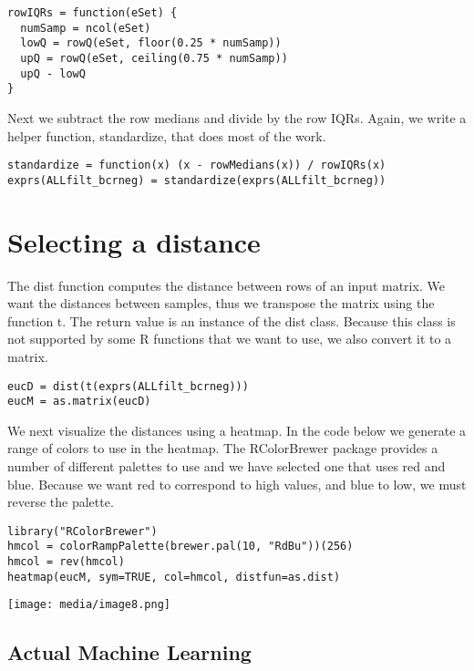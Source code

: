 \begin{verbatim}
rowIQRs = function(eSet) {
  numSamp = ncol(eSet)
  lowQ = rowQ(eSet, floor(0.25 * numSamp))
  upQ = rowQ(eSet, ceiling(0.75 * numSamp))
  upQ - lowQ
}
\end{verbatim}

Next we subtract the row medians and divide by the row IQRs. Again, we
write a helper function, standardize, that does most of the work.

\begin{verbatim}
standardize = function(x) (x - rowMedians(x)) / rowIQRs(x)
exprs(ALLfilt_bcrneg) = standardize(exprs(ALLfilt_bcrneg))
\end{verbatim}

\hypertarget{selecting-a-distance}{%
\section{Selecting a distance}\label{selecting-a-distance}}

The dist function computes the distance between rows of an input matrix.
We want the distances between samples, thus we transpose the matrix
using the function t. The return value is an instance of the dist class.
Because this class is not supported by some R functions that we want to
use, we also convert it to a matrix.

\begin{verbatim}
eucD = dist(t(exprs(ALLfilt_bcrneg)))
eucM = as.matrix(eucD)
\end{verbatim}

We next visualize the distances using a heatmap. In the code below we
generate a range of colors to use in the heatmap. The RColorBrewer
package provides a number of different palettes to use and we have
selected one that uses red and blue. Because we want red to correspond
to high values, and blue to low, we must reverse the palette.

\begin{verbatim}
library("RColorBrewer")
hmcol = colorRampPalette(brewer.pal(10, "RdBu"))(256)
hmcol = rev(hmcol)
heatmap(eucM, sym=TRUE, col=hmcol, distfun=as.dist)
\end{verbatim}

\texttt{[image: media/image8.png]}

\hypertarget{actual-machine-learning}{%
\subsection{Actual Machine Learning}\label{actual-machine-learning}}

